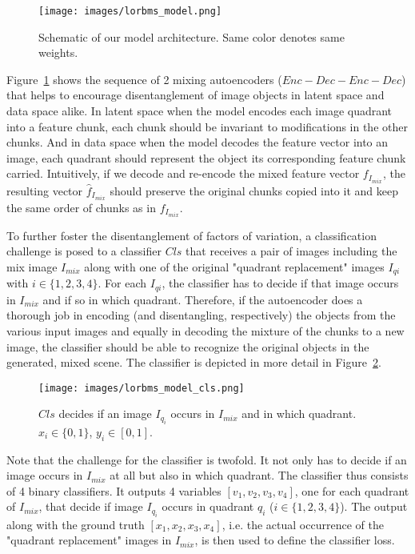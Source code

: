 \documentclass[12pt,a4paper]{article}
\begin{document}
\begin{figure}[ht]
\centering
\texttt{[image: images/lorbms\_model.png]}
\caption{Schematic of our model architecture. Same color denotes same weights.}
\label{fig:model_arch}
\end{figure}

Figure~\ref{fig:model_arch} shows the sequence of 2 mixing autoencoders ($Enc-Dec-Enc-Dec$) that helps to encourage disentanglement of image objects in latent space and data space alike. In latent space when the model encodes each image quadrant into a feature chunk, each chunk should be invariant to modifications in the other chunks. And in data space when the model decodes the feature vector into an image, each quadrant should represent the object its corresponding feature chunk carried. Intuitively, if we decode and re-encode the mixed feature vector $f_{I_{mix}}$, the resulting vector $\hat{f}_{I_{mix}}$ should preserve the original chunks copied into it and keep the same order of chunks as in $f_{I_{mix}}$.

To further foster the disentanglement of factors of variation, a classification challenge is posed to a classifier $Cls$ that receives a pair of images including the mix image $I_{mix}$ along with one of the original "quadrant replacement" images $I_{qi}$ with $i \in \{1,2,3,4\}$. For each $I_{qi}$, the classifier has to decide if that image occurs in $I_{mix}$ and if so in which quadrant. Therefore, if the autoencoder does a thorough job in encoding (and disentangling, respectively) the objects from the various input images and equally in decoding the mixture of the chunks to a new image, the classifier should be able to recognize the original objects in the generated, mixed scene. The classifier is depicted in more detail in Figure~\ref{fig:model_cls}.
\begin{figure}[ht]
\centering
\texttt{[image: images/lorbms\_model\_cls.png]}
\caption{$Cls$ decides if an image $I_{q_i}$ occurs in $I_{mix}$ and in which quadrant. $x_i \in \{0,1\}$, $y_i \in [0,1]$.}
\label{fig:model_cls}
\end{figure}
Note that the challenge for the classifier is twofold. It not only has to decide if an image occurs in $I_{mix}$ at all but also in which quadrant. The classifier thus consists of 4 binary classifiers. It outputs 4 variables $[v_1,v_2,v_3,v_4]$, one for each quadrant of $I_{mix}$, that decide if image $I_{q_i}$ occurs in quadrant $q_i$ ($i \in \{1,2,3,4\}$). The output along with the ground truth $[x_1,x_2,x_3,x_4]$, i.e. the actual occurrence of the "quadrant replacement" images in $I_{mix}$, is then used to define the classifier loss. 
\end{document}
